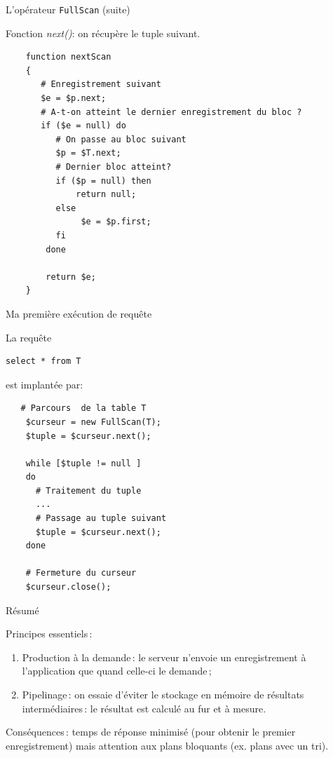 \begin{frame}[fragile]{L'opérateur \texttt{FullScan} (suite)}

Fonction \textit{next()}: on récupère le tuple suivant.

\begin{verbatim}
    function nextScan 
    {
       # Enregistrement suivant
       $e = $p.next;       
       # A-t-on atteint le dernier enregistrement du bloc ?
       if ($e = null) do
          # On passe au bloc suivant
          $p = $T.next;
          # Dernier bloc atteint?
          if ($p = null) then
              return null;
          else
               $e = $p.first;
          fi
        done
 
        return $e;
    }
\end{verbatim}

\end{frame}


\begin{frame}[fragile]{Ma première exécution de requête}

La requête
\begin{verbatim}
select * from T
\end{verbatim}

est implantée par:

\begin{verbatim}
   # Parcours  de la table T
    $curseur = new FullScan(T);
    $tuple = $curseur.next();
    
    while [$tuple != null ]
    do
      # Traitement du tuple
      ...
      # Passage au tuple suivant
      $tuple = $curseur.next();
    done 
    
    # Fermeture du curseur
    $curseur.close();
\end{verbatim}

\end{frame}


\begin{frame}{Résumé}

Principes essentiels\,:

\begin{enumerate}
  \item \alert{Production à la demande}\,: le serveur
     n'envoie un enregistrement à l'application que quand
    celle-ci le demande\,;

   \item \alert{Pipelinage}\,: on essaie d'éviter le stockage 
          en mémoire de résultats intermédiaires\,: le résultat
      est calculé au fur et à mesure.
\end{enumerate}

Conséquences\,: \alert{temps de réponse minimisé} (pour obtenir
    le premier enregistrement) mais 
 \alert{attention aux plans bloquants} (ex. plans avec un tri).

\end{frame}